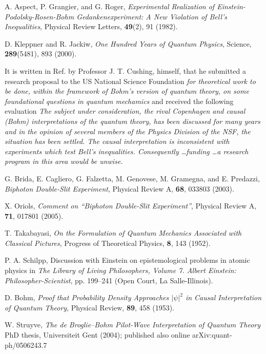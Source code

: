 \documentclass[onecolumn,nofootinbib, secnumarabic, amsmath, nobibnotes,12pt,aps,pra]{revtex4-1}
\begin{document}
\begin{thebibliography}{999}
A. Aspect, P. Grangier, and G. Roger, \emph{Experimental Realization of Einstein-Podolsky-Rosen-Bohm Gedankenexperiment: A New Violation of Bell's Inequalities}, Physical Review Letters, \textbf{49}(2),  91 (1982).

D. Kleppner and R. Jackiw, \emph{One Hundred Years of Quantum Physics}, Science, \textbf{289}(5481),  893 (2000).

It is written in Ref. \cite{om.appraisal} by Professor J. T. Cushing, himself, that he submitted a research proposal to the US National Science Foundation \textit{for theoretical work to be done, within the framework of Bohm's version of quantum theory, on some foundational questions in quantum mechamics} and received the following evaluation \textit{The subject under consideration, the rival Copenhagen and causal (Bohm) interpretations of the quantum theory, has been discussed for many years and in the opinion of several members of the Physics Division of the NSF, the situation has been settled. The causal interpretation is inconsistent with experiments which test Bell's inequalities. Consequently \ldots funding \ldots a research program in this area would be unwise.}

G. Brida, E. Cagliero, G. Falzetta, M. Genovese, M. Gramegna, and E. Predazzi, \emph{Biphoton Double-Slit Experiment}, Physical Review A, \textbf{68},  033803 (2003).

X. Oriols, \emph{Comment on ``Biphoton Double-Slit Experiment''}, Physical Review A, \textbf{71},  017801 (2005).

T. Takabayasi, \emph{On the Formulation of Quantum Mechanics Associated with Classical Pictures}, Progress of Theoretical Physics, \textbf{8},  143 (1952).

P. A. Schilpp, Discussion with Einstein on epistemological problems in atomic physics in \emph{The Library of Living Philosophers, Volume 7. Albert Einstein: Philosopher-Scientist}, pp. 199--241 (Open Court, La Salle-Illinois).

D. Bohm, \emph{Proof that Probability Density Approaches $|\psi|^2$ in Causal Interpretation of Quantum Theory}, Physical Review, \textbf{89},  458 (1953).

W. Struyve, \emph{The de Broglie--Bohm Pilot-Wave Interpretation of Quantum Theory} PhD thesis, Universiteit Gent (2004); published also online arXiv:quant-ph/0506243.7


\end{thebibliography}
\end{document}
